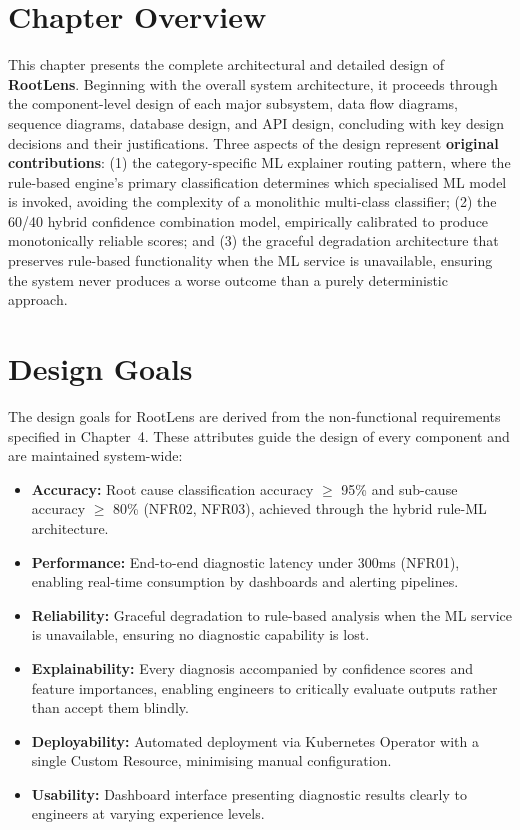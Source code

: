 
\section{Chapter Overview}
This chapter presents the complete architectural and detailed design of \textbf{RootLens}. Beginning with the overall system architecture, it proceeds through the component-level design of each major subsystem, data flow diagrams, sequence diagrams, database design, and API design, concluding with key design decisions and their justifications. Three aspects of the design represent \textbf{original contributions}: (1) the category-specific ML explainer routing pattern, where the rule-based engine's primary classification determines which specialised ML model is invoked, avoiding the complexity of a monolithic multi-class classifier; (2) the 60/40 hybrid confidence combination model, empirically calibrated to produce monotonically reliable scores; and (3) the graceful degradation architecture that preserves rule-based functionality when the ML service is unavailable, ensuring the system never produces a worse outcome than a purely deterministic approach.

\section{Design Goals}
The design goals for RootLens are derived from the non-functional requirements specified in Chapter~4. These attributes guide the design of every component and are maintained system-wide:

\begin{itemize}
    \item \textbf{Accuracy:} Root cause classification accuracy $\geq$ 95\% and sub-cause accuracy $\geq$ 80\% (NFR02, NFR03), achieved through the hybrid rule-ML architecture.
    \item \textbf{Performance:} End-to-end diagnostic latency under 300ms (NFR01), enabling real-time consumption by dashboards and alerting pipelines.
    \item \textbf{Reliability:} Graceful degradation to rule-based analysis when the ML service is unavailable, ensuring no diagnostic capability is lost.
    \item \textbf{Explainability:} Every diagnosis accompanied by confidence scores and feature importances, enabling engineers to critically evaluate outputs rather than accept them blindly.
    \item \textbf{Deployability:} Automated deployment via Kubernetes Operator with a single Custom Resource, minimising manual configuration.
    \item \textbf{Usability:} Dashboard interface presenting diagnostic results clearly to engineers at varying experience levels.
\end{itemize}

